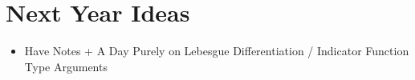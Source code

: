 \documentclass{exam}
\theoremstyle{problemstyle}
\newcommand{\1}[1]{\textbf{1}_{\left[#1\right]}} %
\begin{document}
\begin{questions}
\begin{parts}
\begin{solution}
\begin{comment}
    	\[ \widehat{T_\alpha f}(n) = \int_0^1 \int_0^1 \sin(x + y) | x - y |^{-\alpha} f(y) e^{-2 \pi i n x}\; dx\; dy. \]




    	My intuition to construct an example here is to consider a function which is widely 

    	Assume $\alpha \geq 1/2$, and write $f_N = \log(N)^{1/2} (\chi_1 + \dots + \chi_M)$, where
    	\begin{itemize}
				\item $(1/C)N \leq M \leq C N$ for some universal constant $C > 0$.
				\item $\chi_j = \chi_{I_j}$ for some interval $I_j$ of length $1/ N \log N$.
				\item If $x,y \in 10 I_j$, $\sin(x + y) \geq 1/2$.
				\item The set of intervals $\{ 10 I_j \}$ are disjoint from one another, where $10 I_j$ denotes the interval with the same center as $I_j$, but ten times the radius.
			\end{itemize}
			Now $T_\alpha \chi_j \geq 0$ for all $j$. And for $x \in 10I_j - 2I_j$,
			\[ T_\alpha \chi_j(x) \geq (1/2) \int_{I_j} |x - y|^{-\alpha} \; dy \gtrsim N^{\alpha - 1}. \]
			and for $k \neq j$,
			\[ T_\alpha \chi_k(x) \gtrsim N^{-1} \]
			Thus $|T_\alpha f| \gtrsim \log(N)^{1/2} (  1 + N^{\alpha - 1} )$

			and so
			\[ |T_\alpha f(x)| \gtrsim \log(N)^{1/2} |T_\alpha \chi_j(x)| \gtrsim \log(N)^{1/2} N^{\alpha - 1/2}. \]
			Thus
			\[ \| T_\alpha f \|_{L^2[0,1]} = \left( \sum_j \| T_\alpha f \|_{L^2(10 I_j - 2 I_j)}^2 \right)^{1/2} \gtrsim \left( \sum_j (N \log N)^{-1} (\log(N) N^{2\alpha - 1}) \right)^{1/2} \gtrsim N^{\alpha - 1/2}. \]
		\end{comment}
    \end{solution}
\end{parts}


\newpage
\section{Next Year Ideas}

\begin{itemize}
	\item Have Notes + A Day Purely on Lebesgue Differentiation / Indicator Function Type Arguments
\end{itemize}


\end{questions}
\end{document}
